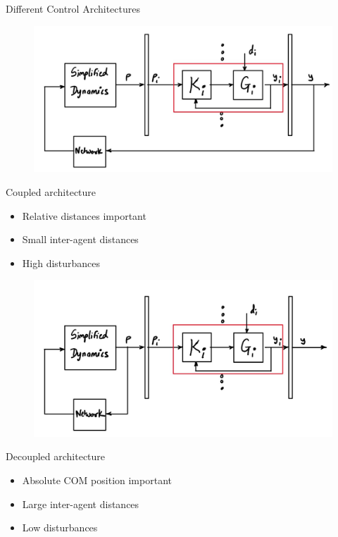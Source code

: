 \begin{frame}{Different Control Architectures}	
	\begin{minipage}{0.46\textwidth}	
		\begin{figure}
			\includegraphics[scale=0.30]{figures/Coupled.jpg}	
			\label{fig:Coupled}
		\end{figure}	
		Coupled architecture
		\begin{itemize}
		\item Relative distances important
		\item Small inter-agent distances
		\item High disturbances
		\end{itemize}
	\end{minipage}
	\hspace{0.5cm}
	\begin{minipage}{0.46\textwidth}
		\begin{figure}
			\includegraphics[scale=0.30]{figures/Decoupled.jpg}	
			\label{fig:Decoupled}
		\end{figure}	
		Decoupled architecture
		\begin{itemize}
			\item Absolute COM position important 
			\item Large inter-agent distances
			\item Low disturbances
		\end{itemize}
	\end{minipage}  
\end{frame}